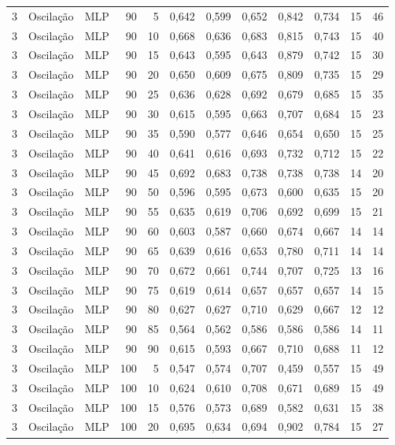 \begin{longtable}{@{}rllrrrrrrrrr@{}}
3 & Oscilação & MLP & 90 & 5 & 0,642 & 0,599 & 0,652 & 0,842 & 0,734 & 15 & 46 \\
3 & Oscilação & MLP & 90 & 10 & 0,668 & 0,636 & 0,683 & 0,815 & 0,743 & 15 & 40 \\
3 & Oscilação & MLP & 90 & 15 & 0,643 & 0,595 & 0,643 & 0,879 & 0,742 & 15 & 30 \\
3 & Oscilação & MLP & 90 & 20 & 0,650 & 0,609 & 0,675 & 0,809 & 0,735 & 15 & 29 \\
3 & Oscilação & MLP & 90 & 25 & 0,636 & 0,628 & 0,692 & 0,679 & 0,685 & 15 & 35 \\
3 & Oscilação & MLP & 90 & 30 & 0,615 & 0,595 & 0,663 & 0,707 & 0,684 & 15 & 23 \\
3 & Oscilação & MLP & 90 & 35 & 0,590 & 0,577 & 0,646 & 0,654 & 0,650 & 15 & 25 \\
3 & Oscilação & MLP & 90 & 40 & 0,641 & 0,616 & 0,693 & 0,732 & 0,712 & 15 & 22 \\
3 & Oscilação & MLP & 90 & 45 & 0,692 & 0,683 & 0,738 & 0,738 & 0,738 & 14 & 20 \\
3 & Oscilação & MLP & 90 & 50 & 0,596 & 0,595 & 0,673 & 0,600 & 0,635 & 15 & 20 \\
3 & Oscilação & MLP & 90 & 55 & 0,635 & 0,619 & 0,706 & 0,692 & 0,699 & 15 & 21 \\
3 & Oscilação & MLP & 90 & 60 & 0,603 & 0,587 & 0,660 & 0,674 & 0,667 & 14 & 14 \\
3 & Oscilação & MLP & 90 & 65 & 0,639 & 0,616 & 0,653 & 0,780 & 0,711 & 14 & 14 \\
3 & Oscilação & MLP & 90 & 70 & 0,672 & 0,661 & 0,744 & 0,707 & 0,725 & 13 & 16 \\
3 & Oscilação & MLP & 90 & 75 & 0,619 & 0,614 & 0,657 & 0,657 & 0,657 & 14 & 15 \\
3 & Oscilação & MLP & 90 & 80 & 0,627 & 0,627 & 0,710 & 0,629 & 0,667 & 12 & 12 \\
3 & Oscilação & MLP & 90 & 85 & 0,564 & 0,562 & 0,586 & 0,586 & 0,586 & 14 & 11 \\
3 & Oscilação & MLP & 90 & 90 & 0,615 & 0,593 & 0,667 & 0,710 & 0,688 & 11 & 12 \\
3 & Oscilação & MLP & 100 & 5 & 0,547 & 0,574 & 0,707 & 0,459 & 0,557 & 15 & 49 \\
3 & Oscilação & MLP & 100 & 10 & 0,624 & 0,610 & 0,708 & 0,671 & 0,689 & 15 & 49 \\
3 & Oscilação & MLP & 100 & 15 & 0,576 & 0,573 & 0,689 & 0,582 & 0,631 & 15 & 38 \\
3 & Oscilação & MLP & 100 & 20 & 0,695 & 0,634 & 0,694 & 0,902 & 0,784 & 15 & 27 \\

\end{longtable}
